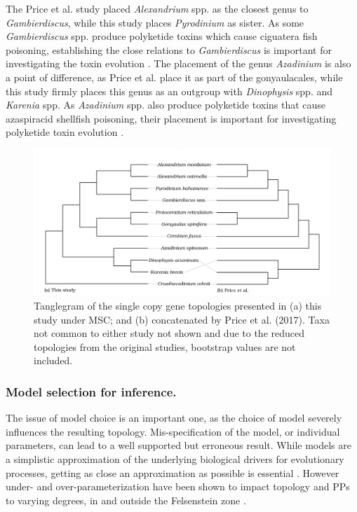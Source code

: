 \documentclass[12pt]{article}
\begin{document}
The Price et al. study placed \emph{Alexandrium} spp. as the closest genus to \emph{Gambierdiscus}, while this study places \emph{Pyrodinium} as sister. 
As some \emph{Gambierdiscus} spp. produce polyketide toxins which cause ciguatera fish poisoning, establishing the close relations to \emph{Gambierdiscus} is important for investigating the toxin evolution \cite{pawlowiez2014transcriptome}.
The placement of the genus \emph{Azadinium} is also a point of difference, as Price et al. place it as part of the gonyaulacales, while this study firmly places this genus as an outgroup with \emph{Dinophysis} spp. and \emph{Karenia} spp.
As \emph{Azadinium} spp. also produce polyketide toxins that cause azaspiracid shellfish poisoning, their placement is important for investigating polyketide toxin evolution \cite{meyer2015transcriptomic}.
 
\begin{figure} 
\includegraphics[scale=.23]{figures/Price-comparison.png}
\caption{Tanglegram of the single copy gene topologies presented in (a) this study under MSC; and (b) concatenated by Price et al. (2017). Taxa not common to either study not shown and due to the reduced topologies from the original studies, bootstrap values are not included.} 
\label{fig:tangle}
\end{figure} 
\FloatBarrier
\subsubsection{Model selection for inference.} The issue of model choice is an important one, as the choice of model severely influences the resulting topology. 
Mis-specification of the model, or individual parameters, can lead to a well supported but erroneous result. 
While models are a simplistic approximation of the underlying biological drivers for evolutionary processes, getting as close an approximation as possible is essential \cite{box1979all}. 
However under- and over-parameterization have been shown to impact topology and PPs to varying degrees, in and outside the Felsenstein zone \cite{lemmon2004importance}. 
\end{document}
